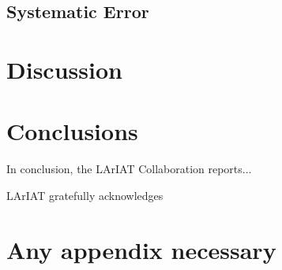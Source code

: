 \documentclass[%
 reprint,
 amsmath,amssymb,
 aps,
]{revtex4-1}
\begin{document}
\subsection{Systematic Error}\label{sec:systematics}


\section{Discussion}


\section{Conclusions}

In conclusion, the LArIAT Collaboration reports...

\acknowledgments

LArIAT gratefully acknowledges 
\appendix



\section{Any appendix necessary} \label{sec:Appendix}
\end{document}
